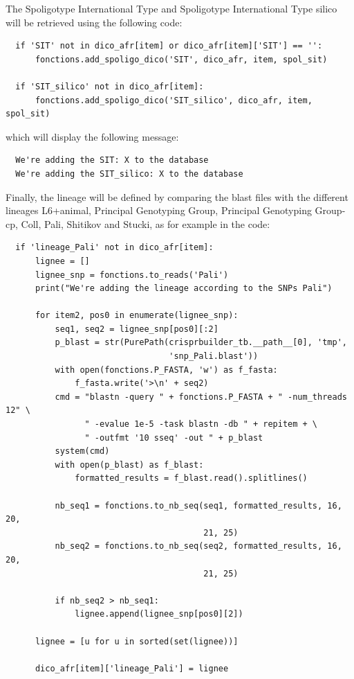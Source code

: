 \documentclass[twoside,a4paper,11pt,frenchb,openany]{report}
\begin{document}
    The Spoligotype International Type and Spoligotype International Type
silico will be retrieved using the following code:

\begin{verbatim}
  if 'SIT' not in dico_afr[item] or dico_afr[item]['SIT'] == '':
      fonctions.add_spoligo_dico('SIT', dico_afr, item, spol_sit)

  if 'SIT_silico' not in dico_afr[item]:
      fonctions.add_spoligo_dico('SIT_silico', dico_afr, item, spol_sit)
\end{verbatim}

    which will display the following message:

    \begin{verbatim}
  We're adding the SIT: X to the database
  We're adding the SIT_silico: X to the database
\end{verbatim}

    Finally, the lineage will be defined by comparing the blast files with
the different lineages L6+animal, Principal Genotyping Group, Principal
Genotyping Group-cp, Coll, Pali, Shitikov and Stucki, as for example in
the code:

\begin{verbatim}
  if 'lineage_Pali' not in dico_afr[item]:
      lignee = []
      lignee_snp = fonctions.to_reads('Pali')
      print("We're adding the lineage according to the SNPs Pali")

      for item2, pos0 in enumerate(lignee_snp):
          seq1, seq2 = lignee_snp[pos0][:2]
          p_blast = str(PurePath(crisprbuilder_tb.__path__[0], 'tmp',
                                 'snp_Pali.blast'))
          with open(fonctions.P_FASTA, 'w') as f_fasta:
              f_fasta.write('>\n' + seq2)
          cmd = "blastn -query " + fonctions.P_FASTA + " -num_threads 12" \
                " -evalue 1e-5 -task blastn -db " + repitem + \
                " -outfmt '10 sseq' -out " + p_blast
          system(cmd)
          with open(p_blast) as f_blast:
              formatted_results = f_blast.read().splitlines()

          nb_seq1 = fonctions.to_nb_seq(seq1, formatted_results, 16, 20,
                                        21, 25)
          nb_seq2 = fonctions.to_nb_seq(seq2, formatted_results, 16, 20,
                                        21, 25)

          if nb_seq2 > nb_seq1:
              lignee.append(lignee_snp[pos0][2])

      lignee = [u for u in sorted(set(lignee))]

      dico_afr[item]['lineage_Pali'] = lignee
\end{verbatim}
\end{document}
